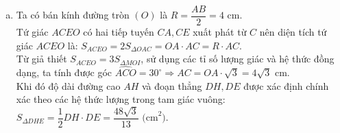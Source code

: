 \begin{bt}
{\begin{enumerate}[a)]
	Vì $\widehat{CDE} = 90^\circ$ (do tiếp tuyến $MD$ vuông góc $OD$ và tương ứng góc nội tiếp) nên $\widehat{DHE} = 90^\circ$, suy ra $DH \perp DE$.
	\item Ta có bán kính đường tròn $(O)$ là $R = \dfrac{AB}{2} = 4\text{ cm}$.\\
	Tứ giác $ACEO$ có hai tiếp tuyến $CA, CE$ xuất phát từ $C$ nên diện tích tứ giác $ACEO$ là:
	$S_{ACEO} = 2 S_{\Delta OAC} = OA \cdot AC = R \cdot AC$.\\
	Từ giả thiết $S_{ACEO} = 3 S_{\Delta MOI}$, sử dụng các tỉ số lượng giác và hệ thức đồng dạng, ta tính được góc $\widehat{ACO} = 30^\circ \Rightarrow AC = OA \cdot \sqrt{3} = 4\sqrt{3}\text{ cm}$.\\
	Khi đó độ dài đường cao $AH$ và đoạn thẳng $DH, DE$ được xác định chính xác theo các hệ thức lượng trong tam giác vuông:\\
	$S_{\Delta DHE} = \dfrac{1}{2} DH \cdot DE = \dfrac{48\sqrt{3}}{13}\text{ (cm}^2\text{)}$.
\end{enumerate}
}
\end{bt}


